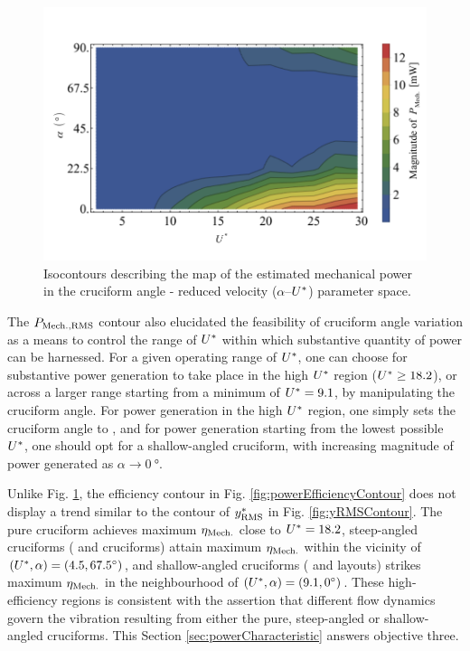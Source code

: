 \documentclass[oneside]{utmthesis}
\begin{document}
\begin{figure}[H]
  \centering
  \includegraphics[width=1\textwidth]{figs/mechanicalPowerContours}
  \caption{Isocontours describing the map of the estimated mechanical power in the cruciform angle - reduced velocity ($\alpha$--$U^{*}$) parameter space.}
  \label{fig:mechanicalPowerContour}
\end{figure}

The $P_{\text{Mech.,RMS}}$ contour also elucidated the feasibility of cruciform angle variation as a means to control the range of $U^{*}$ within which substantive quantity of power can be harnessed. For a given operating range of $U^{*}$, one can choose for substantive power generation to take place in the high $U^{*}$ region ($U^{*} \geq 18.2$), or across a larger range starting from a minimum of $U^{*} = 9.1$, by manipulating the cruciform angle. For power generation in the high $U^{*}$ region, one simply sets the cruciform angle to \angfi{}, and for power generation starting from the lowest possible $U^{*}$, one should opt for a shallow-angled cruciform, with increasing magnitude of power generated as $\alpha \rightarrow \SI{0}{\degree}$.

Unlike Fig. \ref{fig:mechanicalPowerContour}, the efficiency contour in Fig. \ref{fig:powerEfficiencyContour} does not display a trend similar to the contour of $y^{*}_{\text{RMS}}$ in Fig. \ref{fig:yRMSContour}. The pure cruciform achieves maximum $\eta_{\text{Mech.}}$ close to $U^{*} = 18.2$, steep-angled cruciforms (\angfo{} and \angth{} cruciforms) attain maximum $\eta_{\text{Mech.}}$ within the vicinity of $(\ured,\alpha) = (\urtw,\angfo)$, and shallow-angled cruciforms (\angtw{} and \angon{} layouts) strikes maximum $\eta_{\text{Mech.}}$ in the neighbourhood of $(\ured,\alpha) = (\urfo,\angon)$. These high-efficiency regions is consistent with the assertion that different flow dynamics govern the vibration resulting from either the pure, steep-angled or shallow-angled cruciforms. This Section \ref{sec:powerCharacteristic} answers objective three.
\end{document}
